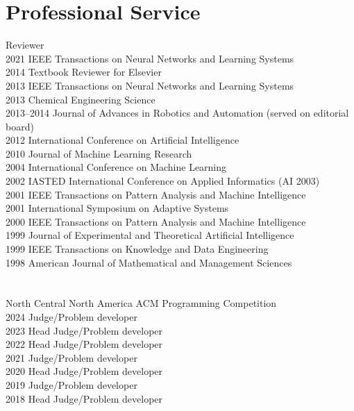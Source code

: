 \documentclass[12pt,letter]{resume}
\begin{document}
\section{Professional Service}{Reviewer}
        {\\
          2021 IEEE Transactions on Neural Networks and Learning Systems\\
          2014 Textbook Reviewer for Elsevier\\
          2013 IEEE Transactions on Neural Networks and Learning Systems\\
          2013 Chemical Engineering Science\\
          2013--2014 Journal of Advances in Robotics and Automation (served on editorial board)\\
2012 International Conference on Artificial Intelligence\\
2010 Journal of Machine Learning Research\\
2004 International Conference on Machine Learning\\
2002 IASTED International Conference on Applied Informatics (AI 2003)\\
2001 IEEE Transactions on Pattern Analysis and Machine Intelligence\\
2001 International Symposium on Adaptive Systems\\
2000 IEEE Transactions on Pattern Analysis and Machine Intelligence \\ 
1999 Journal of Experimental and Theoretical Artificial Intelligence\\
1999 IEEE Transactions on Knowledge and Data Engineering\\
\rm
1998 American Journal of Mathematical and Management Sciences\\
}


        \section{}{North Central North America ACM Programming Competition}
        {\\
        2024 Judge/Problem developer\\
        2023 Head Judge/Problem developer\\
        2022 Head Judge/Problem developer\\
        2021 Judge/Problem developer\\
        2020 Head Judge/Problem developer\\
        2019 Judge/Problem developer\\
        2018 Head Judge/Problem developer\\
        }
\end{document}
